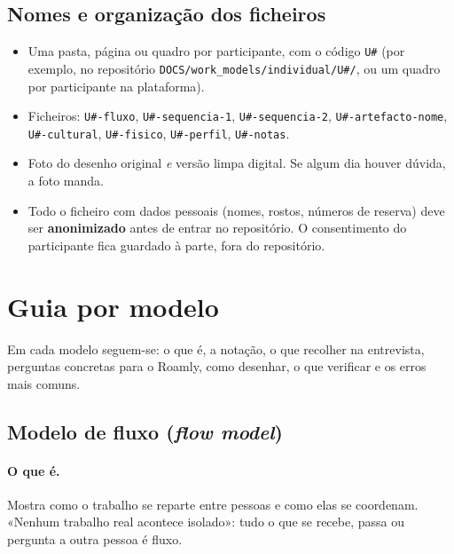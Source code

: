 \documentclass[11pt,a4paper]{article}
\begin{document}
\subsection{Nomes e organização dos ficheiros}\label{sec:nomes}

\begin{itemize}
  \item Uma pasta, página ou quadro por participante, com o código \texttt{U\#} (por exemplo, no repositório \texttt{DOCS/work\_models/individual/U\#/}, ou um quadro por participante na plataforma).
  \item Ficheiros: \texttt{U\#-fluxo}, \texttt{U\#-sequencia-1}, \texttt{U\#-sequencia-2}, \texttt{U\#-artefacto-nome}, \texttt{U\#-cultural}, \texttt{U\#-fisico}, \texttt{U\#-perfil}, \texttt{U\#-notas}.
  \item Foto do desenho original \emph{e} versão limpa digital. Se algum dia houver dúvida, a foto manda.
  \item Todo o ficheiro com dados pessoais (nomes, rostos, números de reserva) deve ser \textbf{anonimizado} antes de entrar no repositório. O consentimento do participante fica guardado à parte, fora do repositório.
\end{itemize}

\section{Guia por modelo}

Em cada modelo seguem-se: o que é, a notação, o que recolher na entrevista, perguntas concretas para o Roamly, como desenhar, o que verificar e os erros mais comuns.

\subsection{Modelo de fluxo (\emph{flow model})}

\paragraph{O que é.} Mostra como o trabalho se reparte entre pessoas e como elas se coordenam. «Nenhum trabalho real acontece isolado»: tudo o que se recebe, passa ou pergunta a outra pessoa é fluxo.
\end{document}
